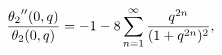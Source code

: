 \[\frac{\mathop{\theta_{2}\/}\nolimits''\!\left(0,q\right)}{\mathop{\theta_{2}\/%
}\nolimits\!\left(0,q\right)}=-1-8\sum_{n=1}^{\infty}\frac{q^{2n}}{(1+q^{2n})^%
{2}},\]